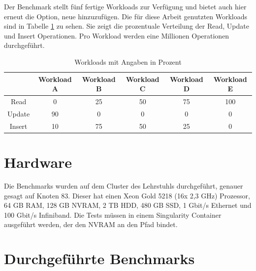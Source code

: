 \documentclass{class/thesis}
\begin{document}
\begin{thesis}
	Der Benchmark stellt fünf fertige Workloads zur Verfügung und bietet auch hier erneut die Option, neue hinzuzufügen. Die für diese Arbeit genutzten Workloads sind in Tabelle \ref{workloadsTabelle} zu sehen.
	Sie zeigt die prozentuale Verteilung der Read, Update und Insert Operationen. Pro Workload werden eine Millionen Operationen durchgeführt.
	
	\begin{table}[H]
		\begin{center}
			\begin{tabular}{c | c | c | c | c | c}
				 & Workload A & Workload B & Workload C & Workload D & Workload E \\ \hline
				Read & 0 & 25 & 50 & 75 & 100 \\
				Update & 90 & 0 & 0 & 0 & 0 \\
				Insert & 10 & 75 & 50 & 25 & 0
			\end{tabular}
		\end{center}
		\caption{Workloads mit Angaben in Prozent}
		\label{workloadsTabelle}
	\end{table}
	
	
	
	\section{Hardware}
	
	Die Benchmarks wurden auf dem Cluster des Lehrstuhls durchgeführt, genauer gesagt auf Knoten 83.
	Dieser hat einen Xeon Gold 5218 (16x 2,3 GHz) Prozessor, 64 GB RAM, 128 GB NVRAM, 2 TB HDD, 480 GB SSD, 1 Gbit/s Ethernet und 100 Gbit/s Infiniband.
	Die Tests müssen in einem Singularity Container ausgeführt werden, der den NVRAM an den Pfad  bindet.
	
	
	
	\section{Durchgeführte Benchmarks}
	

\end{thesis}
\end{document}
